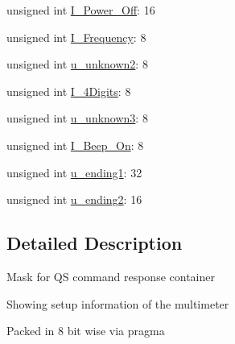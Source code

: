 \begin{DoxyCompactItemize}
\item 
unsigned int \hyperlink{structFluke_1_1Fluke189_1_1cmdr__QS__t_a34b393258b0e2eda8c2eedde9bbe1ef6}{I\_\-Power\_\-Off}: 16
\item 
unsigned int \hyperlink{structFluke_1_1Fluke189_1_1cmdr__QS__t_abe993a772a9e7e60e8544d3a3eab3285}{I\_\-Frequency}: 8
\item 
unsigned int \hyperlink{structFluke_1_1Fluke189_1_1cmdr__QS__t_ada1764cd45a6a8339b44a41d30fbdb86}{u\_\-unknown2}: 8
\item 
unsigned int \hyperlink{structFluke_1_1Fluke189_1_1cmdr__QS__t_a6a49dfb0dca0dcd8dad482711112693d}{I\_\-4Digits}: 8
\item 
unsigned int \hyperlink{structFluke_1_1Fluke189_1_1cmdr__QS__t_a5df8b378d557e36494d127471e465612}{u\_\-unknown3}: 8
\item 
unsigned int \hyperlink{structFluke_1_1Fluke189_1_1cmdr__QS__t_a9d2d8906c189f591970802076393cea5}{I\_\-Beep\_\-On}: 8
\item 
unsigned int \hyperlink{structFluke_1_1Fluke189_1_1cmdr__QS__t_ae5e99fd781866c32cdba484e15276d7a}{u\_\-ending1}: 32
\item 
unsigned int \hyperlink{structFluke_1_1Fluke189_1_1cmdr__QS__t_a08dec92163b6c7a734cdf4aa185d0875}{u\_\-ending2}: 16
\end{DoxyCompactItemize}


\subsection{Detailed Description}
Mask for QS command response container\par
 Showing setup information of the multimeter\par
 Packed in 8 bit wise via pragma\par
 

